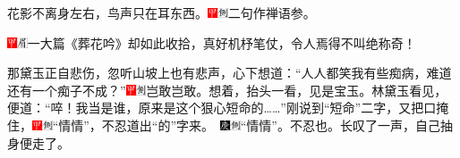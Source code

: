 花影不离身左右，鸟声只在耳东西。{\includegraphics[width=3mm]{../Images/00002}\includegraphics[width=3mm]{../Images/00011}\footnotesize \kaishu 二句作禅语参。}

{{\includegraphics[width=3mm]{../Images/00002}\includegraphics[width=3mm]{../Images/00010}\footnotesize \kaishu 一大篇《葬花吟》却如此收拾，真好机杼笔仗，令人焉得不叫绝称奇！}}

那黛玉正自悲伤，忽听山坡上也有悲声，心下想道：``人人都笑我有些痴病，难道还有一个痴子不成？''{\includegraphics[width=3mm]{../Images/00002}\includegraphics[width=3mm]{../Images/00011}\footnotesize \kaishu 岂敢岂敢。}想着，抬头一看，见是宝玉。林黛玉看见，便道：``啐！我当是谁，原来是这个狠心短命的\ldots{}\ldots{}''刚说到``短命''二字，又把口掩住，{\includegraphics[width=3mm]{../Images/00002}\includegraphics[width=3mm]{../Images/00011}\footnotesize \kaishu ``情情''，不忍道出``的''字来。　\includegraphics[width=3mm]{../Images/00004}\includegraphics[width=3mm]{../Images/00011}\footnotesize \kaishu ``情情''。不忍也。}长叹了一声，自己抽身便走了。

